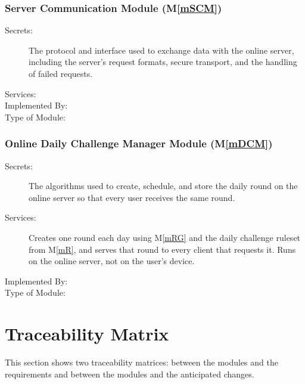 \documentclass[12pt, titlepage]{article}
\newcommand{\mref}[1]{M\ref{#1}}
\begin{document}
\subsubsection{Server Communication Module (\mref{mSCM})}

\begin{description}
\item[Secrets:] The protocol and interface used to exchange data with the online server, including the server's request formats, secure transport, and the handling of failed requests.
\item[Services:]
\item[Implemented By:]
\item[Type of Module:]
\end{description}

\subsubsection{Online Daily Challenge Manager Module (\mref{mDCM})}

\begin{description}
\item[Secrets:] The algorithms used to create, schedule, and store the daily round on the online server so that every user receives the same round.
\item[Services:] Creates one round each day using \mref{mRG} and the daily challenge ruleset from \mref{mR}, and serves that round to every client that requests it. Runs on the online server, not on the user's device.
\item[Implemented By:]
\item[Type of Module:]
\end{description}

\section{Traceability Matrix} \label{SecTM}

This section shows two traceability matrices: between the modules and the
requirements and between the modules and the anticipated changes.
\end{document}

